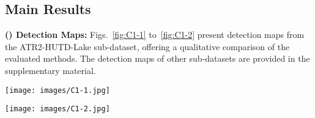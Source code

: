 \subsection{Main Results} \label{sec:4.3}
\textbf{() Detection Maps:} Figs.~\ref{fig:C1-1} to~\ref{fig:C1-2} present detection maps from the ATR2-HUTD-Lake sub-dataset, offering a qualitative comparison of the evaluated methods.
The detection maps of other sub-datasets are provided in the supplementary material.
\par
\begin{figure*}[!t]                 
    \centering                    
    \texttt{[image: images/C1-1.jpg]}                     
    \caption{Detection maps of ATR2-HUTD Lake Scene1. (a) Pseudo-color image. (b) Ground truth. (c) CEM. (d) SAM. (e) IEEPST. (f) MCLT. (g) UTD-Net. (h) TUTDF. (i) TDSS-UTD. (j) NUN-UTD. (m) HUCLNet+CEM. (n) HUCLNet+SAM.}                  
    \label{fig:C1-1}    
\end{figure*}
\begin{figure*}[!t]                 
    \centering                    
    \texttt{[image: images/C1-2.jpg]}                     
    \caption{Detection maps of ATR2-HUTD Lake Scene2. (a) Pseudo-color image. (b) Ground truth. (c) CEM. (d) SAM. (e) IEEPST. (f) MCLT. (g) UTD-Net. (h) TUTDF. (i) TDSS-UTD. (j) NUN-UTD. (m) HUCLNet+CEM. (n) HUCLNet+SAM.}                    
    \label{fig:C1-2}    
\end{figure*}
